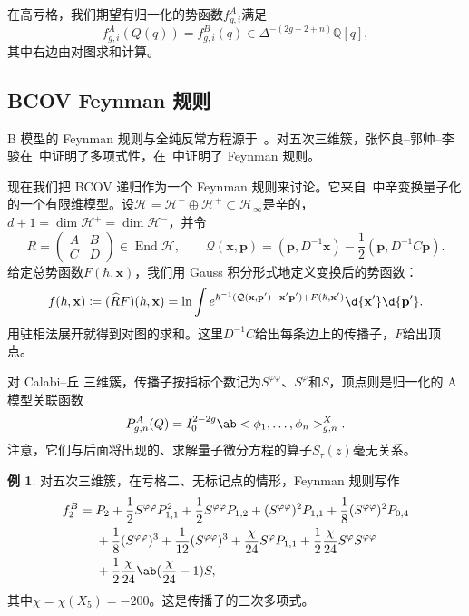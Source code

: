 \documentclass{amsart}
\theoremstyle{definition}
\newtheorem{exm}[thm]{例}
\theoremstyle{remark}
\theoremstyle{plain}
\theoremstyle{definition}
\theoremstyle{remark}
\newcommand{\Q}{\mathbb{Q}}
\newcommand{\mc}[1]{\mathcal{#1}}
\newcommand{\mbf}[1]{\mathbf{#1}}
\newcommand{\bp}{\mbf{p}}
\newcommand{\wh}[1]{\widehat{#1}}
\newcommand{\1}{\mathbf{1}}
\newcommand{\2}{\mathbf{2}}
\newcommand{\3}{\mathbf{3}}
\DeclareMathOperator{\End}{End}
\begin{document}
在高亏格，我们期望有归一化的势函数\(f^A_{g,i}\)满足
\[ f^A_{g,i}(Q(q)) = f^B_{g,i}(q) \in \Delta^{-(2g-2+n)}\Q[q], \]
其中右边由对图求和计算。

\subsection{BCOV Feynman 规则}%
\label{sub:The BCOV Feynman rule}

B 模型的 Feynman 规则与全纯反常方程源于~\cite{BCOV1994}。对五次三维簇，张怀良--郭帅--李骏在~\cite{CGL2021}中证明了多项式性，在~\cite{CGL2026}中证明了 Feynman 规则。

现在我们把 BCOV 递归作为一个 Feynman 规则来讨论。它来自~中辛变换量子化的一个有限维模型。设\(\mc{H} = \mc{H}^- \oplus \mc{H}^+ \subset \mc{H}_{\infty}\)是辛的，\(d+1 = \dim \mc{H}^+ = \dim \mc{H}^-\)，并令
\[ R = \begin{pmatrix} A & B \\ C & D \end{pmatrix} \in \End \mc{H}, \qquad \mc{Q}(\mbf{x},\bp) = (\bp, D^{-1}\mbf{x}) - \frac{1}{2}(\bp, D^{-1}C\bp). \]
给定总势函数\(F(\hbar, \mbf{x})\)，我们用 Gauss 积分形式地定义变换后的势函数：
\[ f(\hbar, \mbf{x}) \coloneqq (\wh{R}F)(\hbar,\mbf{x}) = \ln \int e^{\hbar^{-1}(\mc{Q}(\mbf{x},\bp') - \mbf{x}'\bp') + F(\hbar,\mbf{x}')}\d{\mbf{x}'}\d{\bp'}. \]
用驻相法展开就得到对图的求和。这里\(D^{-1}C\)给出每条边上的传播子，\(F\)给出顶点。

对 Calabi--丘 三维簇，传播子按指标个数记为\(S^{\varphi\varphi}\)、\(S^{\varphi}\)和\(S\)，顶点则是归一化的 A 模型关联函数
\[ P^A_{g,n}(Q) = I_0^{2-2g}\ab<\phi_1, \ldots, \phi_n>^X_{g,n}. \]
注意，它们与后面将出现的、求解量子微分方程的算子\(S_{\tau}(z)\)毫无关系。

\begin{exm}
    对五次三维簇，在亏格二、无标记点的情形，Feynman 规则写作
    \begin{align*}
        f_2^B ={}& P_2 + \frac{1}{2}S^{\varphi\varphi}P_{1,1}^2 + \frac{1}{2}S^{\varphi\varphi}P_{1,2} + (S^{\varphi\varphi})^2 P_{1,1} + \frac{1}{8}(S^{\varphi\varphi})^2 P_{0,4} \\
        &+ \frac{1}{8}(S^{\varphi\varphi})^3 + \frac{1}{12}(S^{\varphi\varphi})^3 + \frac{\chi}{24}S^{\varphi}P_{1,1} + \frac{1}{2}\frac{\chi}{24}S^{\varphi}S^{\varphi\varphi} \\
        &+ \frac{1}{2}\frac{\chi}{24}\ab(\frac{\chi}{24}-1)S,
    \end{align*}
    其中\(\chi = \chi(X_5) = -200\)。这是传播子的三次多项式。
\end{exm}
\end{document}
